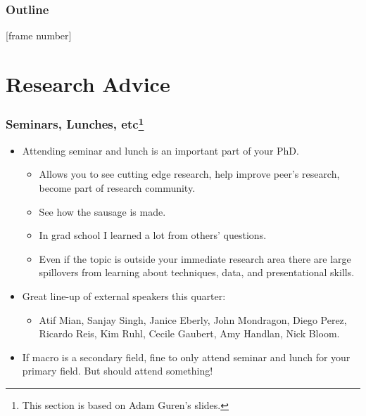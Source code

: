 \documentclass[english,xcolor=svgnames]{beamer}
\begin{document}




\begin{frame}
\frametitle{Outline}   
\tableofcontents[hideallsubsections] 
\end{frame}
\addtocounter{framenumber}{-1}
[frame number]{}


\section{Research Advice}

\begin{frame}
\frametitle[alignment=center]{Seminars, Lunches, etc\footnote{This section is based on Adam Guren's slides.}}
\begin{itemize}
	\item Attending seminar and lunch is an important part of your PhD.
	\begin{itemize}
		\item Allows you to see cutting edge research, help improve peer's research, become part of research community.
		\item See how the sausage is made.
		\item In grad school I learned a lot from others' questions.
		\item Even if the topic is outside your immediate research area there are large spillovers from learning about techniques, data, and presentational skills.
	\end{itemize}
	\item Great line-up of external speakers this quarter:
	\begin{itemize}
		\item Atif Mian, Sanjay Singh, Janice Eberly, John Mondragon, Diego Perez, Ricardo Reis, Kim Ruhl, Cecile Gaubert, Amy Handlan, Nick Bloom.
	\end{itemize}
	\item If macro is a secondary field, fine to only attend seminar and lunch for your primary field. But should attend something!
\end{itemize}
\end{frame}
\end{document}
